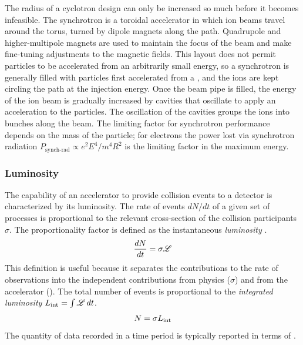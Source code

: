 The radius of a cyclotron design can only be increased so much before it becomes infeasible.
The synchrotron is a toroidal accelerator in which ion beams travel around the torus, turned by dipole magnets along the path.
Quadrupole and higher-multipole magnets are used to maintain the focus of the beam and make fine-tuning adjustments to the magnetic fields.
This layout does not permit particles to be accelerated from an arbitrarily small energy, so a synchrotron is generally filled with particles first accelerated from a \linac, and the ions are kept circling the path at the injection energy.
Once the beam pipe is filled, the energy of the ion beam is gradually increased by \rf cavities that oscillate to apply an acceleration to the particles.
The oscillation of the \rf cavities groups the ions into bunches along the beam.
The limiting factor for synchrotron performance depends on the mass of the particle; for electrons the power lost via synchrotron radiation $P_\textrm{synch-rad} \propto e^2 E^4 / m^4 R^2 $ is the limiting factor in the maximum energy.

\subsubsection{Luminosity}

The capability of an accelerator to provide collision events to a detector is characterized by its luminosity.
The rate of events $dN/dt$ of a given set of processes is proportional to the relevant cross-section of the collision participants $\sigma$.
The proportionality factor is defined as the instantaneous \emph{luminosity} \Lumi.
\begin{equation}
\label{eq:rate_lumi}
\frac{dN}{dt} = \sigma \mathscr{L}
\end{equation}
This definition is useful because it separates the contributions to the rate of observations into the independent contributions from physics ($\sigma$) and from the accelerator (\Lumi).
The total number of events is proportional to the \emph{integrated luminosity} $L_\mathrm{int} = \int \mathscr{L} \, dt$.
\begin{equation}
N = \sigma L_\mathrm{int}
\end{equation}
The quantity of data recorded in a time period is typically reported in terms of \Lint.

